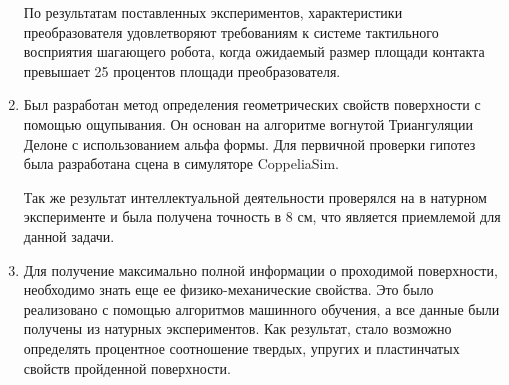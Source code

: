 \begin{enumerate}
  По результатам поставленных экспериментов, характеристики преобразователя удовлетворяют требованиям к системе тактильного восприятия шагающего робота, когда ожидаемый размер площади контакта превышает 25 процентов площади преобразователя.
  \item Был разработан метод определения геометрических свойств поверхности с помощью ощупывания. Он основан на алгоритме вогнутой Триангуляции Делоне с использованием альфа формы. Для первичной проверки гипотез была разработана сцена в симуляторе CoppeliaSim.

  Так же результат интеллектуальной деятельности проверялся на в натурном эксперименте и была получена точность в 8 см, что является приемлемой для данной задачи.
  \item Для получение максимально полной информации о проходимой поверхности, необходимо знать еще ее физико-механические свойства. Это было реализовано с помощью алгоритмов машинного обучения, а все данные были получены из натурных экспериментов. Как результат, стало возможно определять процентное соотношение твердых, упругих и пластинчатых свойств пройденной поверхности.
\end{enumerate}